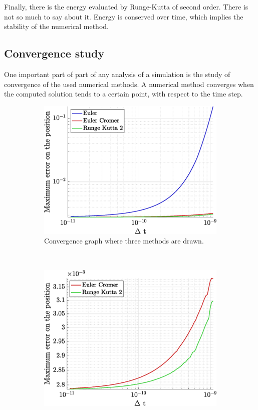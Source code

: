 \documentclass[a4paper,12pt,twoside]{article}
\begin{document}
Finally, there is the energy evaluated by Runge-Kutta of second order.
There is not so much to say about it.
Energy is conserved over time, which implies the stability of the numerical method.\\



\subsection{Convergence study}\label{sec:etude-conv}
One important part of part of any analysis of a simulation is the study of convergence of the used numerical methods.
A numerical method converges when the computed solution tends to a certain point, with respect to the time step.\\

\begin{figure}[h]
\centering
\begin{subfigure}[t]{0.45\textwidth}
	\includegraphics[width=\textwidth]{graphs/ex2_ii_conv_ALL.eps}
	\caption{Convergence graph where three methods are drawn.}
	\label{fig:app1-conv-ALL}
\end{subfigure}
~
\begin{subfigure}[t]{0.45\textwidth}
	\includegraphics[width=\textwidth]{graphs/ex2_ii_conv_NoEuler.eps}

\end{subfigure}
\end{figure}
\end{document}
